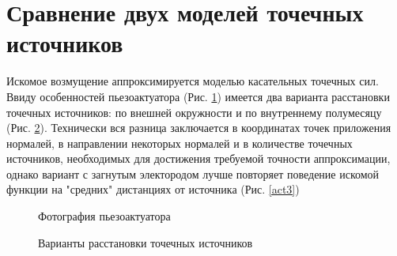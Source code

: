 \documentclass[a4paper, 12pt]{article}
\begin{document}
\section{Сравнение двух моделей точечных источников}
Искомое возмущение аппроксимируется моделью касательных точечных сил. Ввиду особенностей пьезоактуатора (Рис. \ref{act1}) имеется два варианта расстановки точечных источников: по внешней окружности и по внутреннему полумесяцу (Рис. \ref{act2}). Технически вся разница заключается в координатах точек приложения нормалей, в направлении некоторых нормалей и в количестве точечных источников, необходимых для достижения требуемой точности аппроксимации, однако вариант с загнутым электородом лучше повторяет поведение искомой функции на "средних" дистанциях от источника (Рис. \ref{act3}) 
\begin{figure}[h]   
    \caption{Фотография пьезоактуатора}
    \label{act1}
\end{figure}
\begin{figure}[h]   
    \caption{Варианты расстановки точечных источников}
    \label{act2}
    \end{figure}
\end{document}
